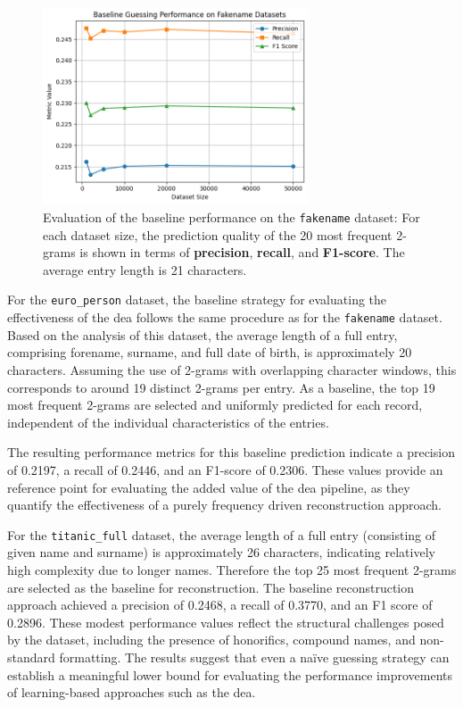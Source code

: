\begin{figure}[H]
    \centering
    \includegraphics[width=0.7\textwidth]{img/fakename_analysis.png}
    \caption{Evaluation of the baseline performance on the \texttt{fakename} dataset: For each dataset size, the prediction quality of the 20 most frequent 2-grams is shown in terms of \textbf{precision}, \textbf{recall}, and \textbf{F1-score}. The average entry length is 21 characters.}
    \label{fig:baseline_metrics}
\end{figure}

For the \texttt{euro\_person} dataset, the baseline strategy for evaluating the effectiveness of the \ac{dea} follows the same procedure as for the \texttt{fakename} dataset.
Based on the analysis of this dataset, the average length of a full entry, comprising forename, surname, and full date of birth, is approximately 20 characters.
Assuming the use of 2-grams with overlapping character windows, this corresponds to around 19 distinct 2-grams per entry.
As a baseline, the top 19 most frequent 2-grams are selected and uniformly predicted for each record, independent of the individual characteristics of the entries.

The resulting performance metrics for this baseline prediction indicate a precision of 0.2197, a recall of 0.2446, and an F1-score of 0.2306.
These values provide an reference point for evaluating the added value of the \ac{dea} pipeline, as they quantify the effectiveness of a purely frequency driven reconstruction approach.

For the \texttt{titanic\_full} dataset, the average length of a full entry (consisting of given name and surname) is approximately 26 characters, indicating relatively high complexity due to longer names.
Therefore the top 25 most frequent 2-grams are selected as the baseline for reconstruction.
The baseline reconstruction approach achieved a precision of 0.2468, a recall of 0.3770, and an F1 score of 0.2896.
These modest performance values reflect the structural challenges posed by the dataset, including the presence of honorifics, compound names, and non-standard formatting.
The results suggest that even a naïve guessing strategy can establish a meaningful lower bound for evaluating the performance improvements of learning-based approaches such as the \ac{dea}.


